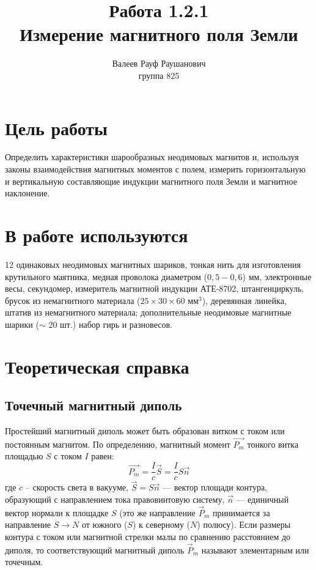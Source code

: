 \documentclass[a4paper, 12pt]{article}%
\author{Валеев Рауф Раушанович \\
группа 825}
\title{\textbf{Работа 1.2.1\\
Измерение магнитного поля Земли}}
\begin{document}
\maketitle
\newpage
\section*{Цель работы}
Определить характеристики шарообразных неодимовых магнитов и, используя законы взаимодействия магнитных моментов с полем, измерить горизонтальную и вертикальную составляющие индукции магнитного поля Земли и магнитное наклонение.
\section*{В работе используются}
12 одинаковых неодимовых магнитных шариков, тонкая нить для изготовления крутильного маятника, медная проволока диаметром ($0,5 - 0,6$) мм, электронные весы, секундомер, измеритель магнитной индукции АТЕ-8702, штангенциркуль, брусок из немагнитного материала ($25\times30\times60$ мм$^3$), деревянная линейка, штатив из немагнитного материала; дополнительные неодимовые магнитные шарики ($\sim$ 20 шт.) набор гирь и разновесов.
\section*{Теоретическая справка}
\subsection*{Точечный магнитный диполь}
Простейший магнитный диполь может быть образован витком с током или постоянным магнитом. По определению, магнитный момент $\vec{P_m}$ тонкого витка площадью $S$ с током $I$ равен:
\begin{equation*}
\vec{P_m} = \dfrac{I}{c}\vec{S} = \dfrac{I}{c} S \vec{n}
\end{equation*} 
где $c$ – скорость света в вакууме, $\vec{S} = S \vec{n}$ — вектор площади контура, образующий с направлением тока правовинтовую систему, $\vec{n}$ --- единичный вектор нормали к площадке $S$ (это же направление $\vec{P}_m$ принимается за направление $S \to N$ от южного ($S$) к северному ($N$) полюсу). Если размеры контура с током или магнитной стрелки малы по сравнению расстоянием до диполя, то соответствующий магнитный диполь $\vec{P}_m$ называют элементарным или точечным.
\end{document}
